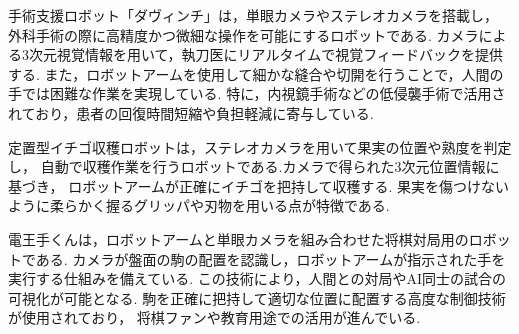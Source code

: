 手術支援ロボット「ダヴィンチ」は，単眼カメラやステレオカメラを搭載し，
外科手術の際に高精度かつ微細な操作を可能にするロボットである.
カメラによる3次元視覚情報を用いて，執刀医にリアルタイムで視覚フィードバックを提供する.
また，ロボットアームを使用して細かな縫合や切開を行うことで，人間の手では困難な作業を実現している.
特に，内視鏡手術などの低侵襲手術で活用されており，患者の回復時間短縮や負担軽減に寄与している.

定置型イチゴ収穫ロボットは，ステレオカメラを用いて果実の位置や熟度を判定し，
自動で収穫作業を行うロボットである.カメラで得られた3次元位置情報に基づき，
ロボットアームが正確にイチゴを把持して収穫する.
果実を傷つけないように柔らかく握るグリッパや刃物を用いる点が特徴である.

電王手くんは，ロボットアームと単眼カメラを組み合わせた将棋対局用のロボットである.
カメラが盤面の駒の配置を認識し，ロボットアームが指示された手を実行する仕組みを備えている.
この技術により，人間との対局やAI同士の試合の可視化が可能となる.
駒を正確に把持して適切な位置に配置する高度な制御技術が使用されており，
将棋ファンや教育用途での活用が進んでいる.